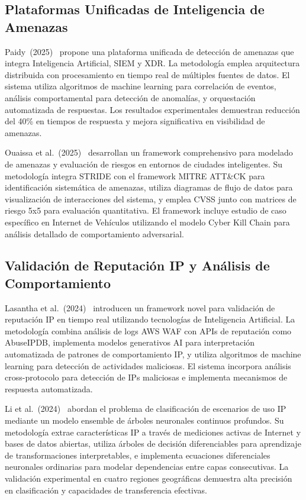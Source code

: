 \subsection{Plataformas Unificadas de Inteligencia de Amenazas}

Paidy~(2025)~\cite{9} propone una plataforma unificada de detección de amenazas que integra Inteligencia Artificial, SIEM y XDR. La metodología emplea arquitectura distribuida con procesamiento en tiempo real de múltiples fuentes de datos. El sistema utiliza algoritmos de machine learning para correlación de eventos, análisis comportamental para detección de anomalías, y orquestación automatizada de respuestas. Los resultados experimentales demuestran reducción del 40\% en tiempos de respuesta y mejora significativa en visibilidad de amenazas.

Ouaissa et al.~(2025)~\cite{10} desarrollan un framework comprehensivo para modelado de amenazas y evaluación de riesgos en entornos de ciudades inteligentes. Su metodología integra STRIDE con el framework MITRE ATT\&CK para identificación sistemática de amenazas, utiliza diagramas de flujo de datos para visualización de interacciones del sistema, y emplea CVSS junto con matrices de riesgo 5x5 para evaluación quantitativa. El framework incluye estudio de caso específico en Internet de Vehículos utilizando el modelo Cyber Kill Chain para análisis detallado de comportamiento adversarial.

\subsection{Validación de Reputación IP y Análisis de Comportamiento}

Lasantha et al.~(2024)~\cite{11} introducen un framework novel para validación de reputación IP en tiempo real utilizando tecnologías de Inteligencia Artificial. La metodología combina análisis de logs AWS WAF con APIs de reputación como AbuseIPDB, implementa modelos generativos AI para interpretación automatizada de patrones de comportamiento IP, y utiliza algoritmos de machine learning para detección de actividades maliciosas. El sistema incorpora análisis cross-protocolo para detección de IPs maliciosas e implementa mecanismos de respuesta automatizada.

Li et al.~(2024)~\cite{12} abordan el problema de clasificación de escenarios de uso IP mediante un modelo ensemble de árboles neuronales continuos profundos. Su metodología extrae características IP a través de mediciones activas de Internet y bases de datos abiertas, utiliza árboles de decisión diferenciables para aprendizaje de transformaciones interpretables, e implementa ecuaciones diferenciales neuronales ordinarias para modelar dependencias entre capas consecutivas. La validación experimental en cuatro regiones geográficas demuestra alta precisión en clasificación y capacidades de transferencia efectivas.

